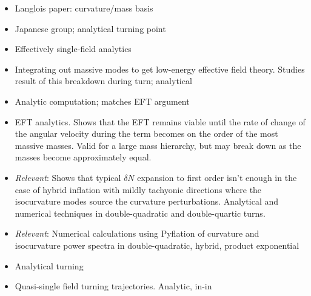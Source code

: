 \documentclass[11pt]{article}
\begin{document}
\begin{itemize}

  \item  Langlois paper: curvature/mass basis \cite{Gao:2013ota}

  \item  Japanese group; analytical turning point \cite{Noumi:2013cfa}

  \item Effectively single-field analytics \cite{Noumi:2012vr}

  \item Integrating out massive modes to get low-energy effective field theory.  Studies result of this breakdown during turn; analytical \cite{Gao:2012uq}

  \item Analytic computation; matches EFT argument \cite{Pi:2012gf}

  \item EFT analytics.  Shows that the EFT remains viable until the rate of change of the angular velocity during the term becomes on the order of the most massive masses.  Valid for a large mass hierarchy, but may break down as the masses become approximately equal.  \cite{Cespedes:2012hu}

  \item \emph{Relevant}: Shows that typical $\delta N$ expansion to first order isn't enough in the case of hybrid inflation with mildly tachyonic directions where the isocurvature modes source the curvature perturbations.  Analytical and numerical techniques in double-quadratic and double-quartic turns. \cite{Avgoustidis:2011em}

  \item \emph{Relevant}: Numerical calculations using Pyflation of curvature and isocurvature power spectra in double-quadratic, hybrid, product exponential \cite{Huston:2011fr}

  \item Analytical turning \cite{Achucarro:2010da}

  \item Quasi-single field turning trajectories.  Analytic, in-in \cite{Chen:2009zp,Chen:2009we}

\end{itemize}






\end{document}
